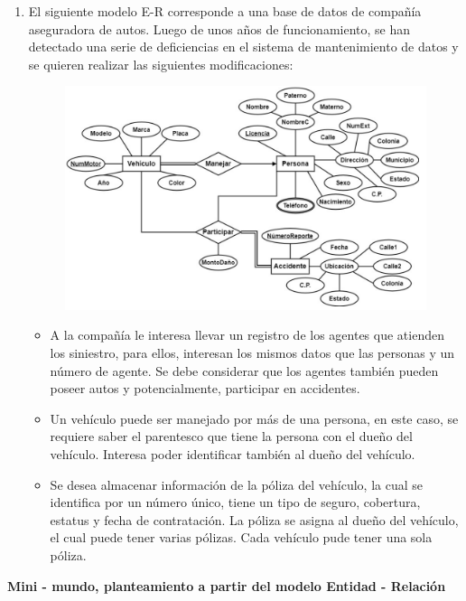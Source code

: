\documentclass{exam}
\begin{document}
\begin{questions}
\begin{enumerate}[label=\roman*.]
		\item El siguiente modelo E-R corresponde a una base de datos de compañía aseguradora de autos. Luego de unos años de funcionamiento, se han detectado una serie de deficiencias en el sistema de mantenimiento de datos y se quieren realizar las siguientes modificaciones:
		\begin{figure}[h!]
			\includegraphics[scale=1]{pregunta_2_ii.png}
		\centering
		\end{figure}
		
		\begin{itemize}
			\item A la compañía le interesa llevar un registro de los agentes que atienden los siniestro, para ellos, interesan los mismos datos que las personas y un número de agente. Se debe considerar que los agentes también pueden poseer autos y potencialmente, participar en accidentes.
			\item Un vehículo puede ser manejado por más de una persona, en este caso, se requiere saber el parentesco que tiene la persona con el dueño del vehículo. Interesa poder identificar también al dueño del vehículo.
			\item Se desea almacenar información de la póliza del vehículo, la cual se identifica por un número único, tiene un tipo de seguro, cobertura, estatus y fecha de contratación. La póliza se asigna al dueño del vehículo, el cual puede tener varias pólizas. Cada vehículo pude tener una sola póliza.
		\end{itemize}				
		
	\end{enumerate}
	
	\question \textbf{Mini - mundo, planteamiento a partir del modelo Entidad - Relación}
	

\end{questions}
\end{document}
